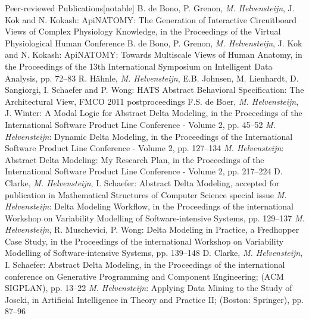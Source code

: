 \begin{rubric}{Peer-reviewed Publications}[notable]
		B. de Bono, P. Grenon, \emph{M. Helvensteijn}, J. Kok and N. Kokash:
		ApiNATOMY: The Generation of Interactive Circuitboard Views of Complex Physiology Knowledge,
		in the Proceedings of the Virtual Physiological Human Conference
		\hfill\emptydoi
		B. de Bono, P. Grenon, \emph{M. Helvensteijn}, J. Kok and N. Kokash:
		ApiNATOMY: Towards Multiscale Views of Human Anatomy,
		in the Proceedings of the 13th International Symposium
		on Intelligent Data Analysis, pp. 72--83
		\hfill{}
		R. H\"ahnle, \emph{M. Helvensteijn}, E.B. Johnsen,
			M. Lienhardt, D. Sangiorgi, I. Schaefer and P. Wong:
		HATS Abstract Behavioral Specification: The Architectural View,
		FMCO 2011 postproceedings
		\hfill{}
		F.S. de Boer, \emph{M. Helvensteijn}, J. Winter:
		A Modal Logic for Abstract Delta Modeling,
		in the Proceedings of the  International Software Product Line Conference
			- Volume 2, pp. 45--52
		\hfill{}
		\emph{M. Helvensteijn}:
		Dynamic Delta Modeling,
		in the Proceedings of the  International Software Product Line Conference
			- Volume 2, pp. 127--134
		\hfill{}
		\emph{M. Helvensteijn}:
		Abstract Delta Modeling: My Research Plan,
		in the Proceedings of the  International Software Product Line Conference
			- Volume 2, pp. 217--224
		\hfill{}
		D. Clarke, \emph{M. Helvensteijn}, I. Schaefer:
		Abstract Delta Modeling,
		accepted for publication in Mathematical Structures of Computer Science special issue
		\hfill\emptydoi
		\emph{M. Helvensteijn}:
		Delta Modeling Workflow,
		in the Proceedings of the  international Workshop on
			Variability Modelling of Software-intensive Systems, pp. 129--137
		\hfill{}
		\emph{M. Helvensteijn}, R. Muschevici, P. Wong:
		Delta Modeling in Practice, a Fredhopper Case Study,
		in the Proceedings of the  international Workshop on
			Variability Modelling of Software-intensive Systems, pp. 139--148
		\hfill{}
		D. Clarke, \emph{M. Helvensteijn}, I. Schaefer:
		Abstract Delta Modeling,
		in the Proceedings of the  international conference on Generative
			Programming and Component Engineering; (ACM SIGPLAN), pp. 13--22
		\hfill{}
		\emph{M. Helvensteijn}:
		Applying Data Mining to the Study of Joseki,
		in Artificial Intelligence in Theory and Practice II; (Boston: Springer), pp. 87--96
		\hfill{}
\end{rubric}
